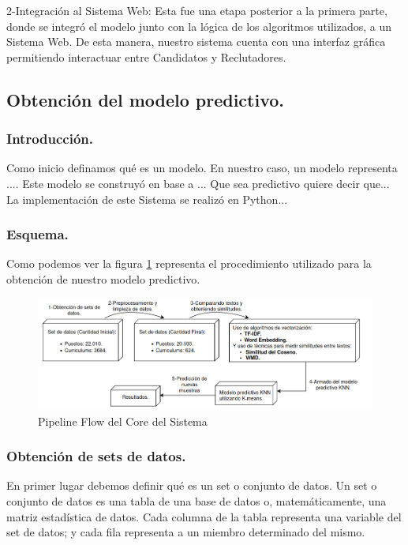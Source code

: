 \documentclass[12pt,a4paper]{article}
\begin{document}
	2-Integración al Sistema Web: Esta fue una etapa posterior a la primera parte, donde se integró el modelo junto con la lógica de los algoritmos utilizados, a un Sistema Web. De esta manera, nuestro sistema cuenta con una interfaz gráfica permitiendo interactuar entre Candidatos y Reclutadores. 
	
\subsection{Obtención del modelo predictivo.}

\subsubsection{Introducción.}
Como inicio definamos qué es un modelo. En nuestro caso, un modelo representa ....
Este modelo se construyó en base a ...
Que sea predictivo quiere decir que...
La implementación de este Sistema se realizó en Python...

\subsubsection{Esquema.}
Como podemos ver la figura \ref{fig:FlowCoreSystem} representa el procedimiento utilizado para la obtención de nuestro modelo predictivo. 

\begin{figure}[H]    %
  \centering
  \includegraphics[width=1\textwidth]{images/flow-core.png} 	%
  \caption{Pipeline Flow del Core del Sistema}  
  \label{fig:FlowCoreSystem}
\end{figure}

\subsubsection{Obtención de sets de datos.}
En primer lugar debemos definir qué es un set o conjunto de datos.
Un set o conjunto de datos es una tabla de una base de datos o, matemáticamente, una matriz estadística de datos. Cada columna de la tabla representa una variable del set de datos; y cada fila representa a un miembro determinado del mismo.
\end{document}
